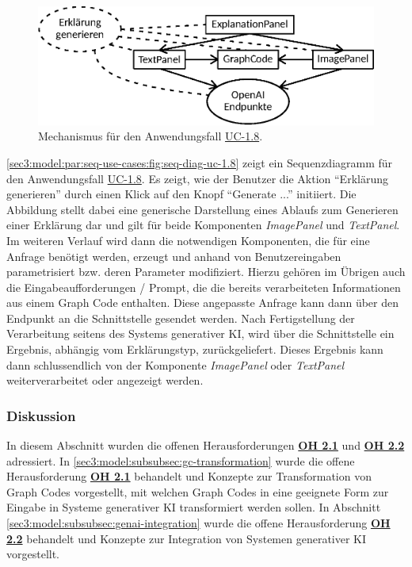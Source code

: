 \begin{figure}[htb]
    \centering
    \includegraphics{chapter/chapter_3/mechanisms/mechanism-uc-1.8.eps}
    \caption{Mechanismus für den Anwendungsfall \hyperref[sec3:model:uc-1.8]{UC-1.8}.}
    \label{sec3:model:par:mechanism-use-cases:fig:mech-uc-1.8}
\end{figure}



\cref{sec3:model:par:seq-use-cases:fig:seq-diag-uc-1.8} zeigt ein Sequenzdiagramm für den Anwendungsfall \hyperref[sec3:model:uc-1.8]{UC-1.8}.
Es zeigt, wie der Benutzer die Aktion \enquote{Erklärung generieren} durch einen Klick auf den Knopf \enquote{Generate ...} initiiert.
Die Abbildung stellt dabei eine generische Darstellung eines Ablaufs zum Generieren einer Erklärung dar und gilt für beide Komponenten \textit{ImagePanel} und \textit{TextPanel}.
Im weiteren Verlauf wird dann die notwendigen Komponenten, die für eine Anfrage benötigt werden, erzeugt und anhand von Benutzereingaben parametrisiert bzw. deren Parameter modifiziert.
Hierzu gehören im Übrigen auch die Eingabeaufforderungen / Prompt, die die bereits verarbeiteten Informationen aus einem Graph Code enthalten.
Diese angepasste Anfrage kann dann über den Endpunkt an die Schnittstelle gesendet werden.
Nach Fertigstellung der Verarbeitung seitens des Systems generativer KI, wird über die Schnittstelle ein Ergebnis, abhängig vom Erklärungstyp, zurückgeliefert.
Dieses Ergebnis kann dann schlussendlich von der Komponente \textit{ImagePanel} oder \textit{TextPanel} weiterverarbeitet oder angezeigt werden.

\FloatBarrier

\subsubsection{Diskussion}
\label{sec3:model:subsubsec:fz2:discussion}
In diesem Abschnitt wurden die offenen Herausforderungen \hyperref[sec2:sota:oi:2.1]{\textbf{OH 2.1}} und \hyperref[sec2:sota:oi:2.2]{\textbf{OH 2.2}} adressiert.
In \cref{sec3:model:subsubsec:gc-transformation} wurde die offene Herausforderung \hyperref[sec2:sota:oi:2.1]{\textbf{OH 2.1}} behandelt und Konzepte zur Transformation von Graph Codes vorgestellt, mit welchen Graph Codes in eine geeignete Form zur Eingabe in Systeme generativer KI transformiert werden sollen.
In Abschnitt \cref{sec3:model:subsubsec:genai-integration} wurde die offene Herausforderung \hyperref[sec2:sota:oi:2.2]{\textbf{OH 2.2}} behandelt und Konzepte zur Integration von Systemen generativer KI vorgestellt.

